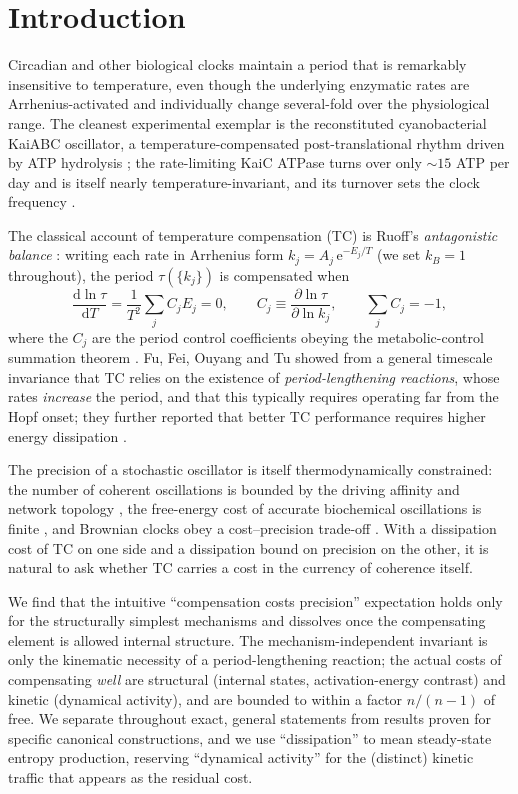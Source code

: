 \documentclass[11pt,onecolumn]{article}
\theoremstyle{definition}
\newcommand{\dd}{\mathrm{d}}
\newcommand{\ee}{\mathrm{e}}
\begin{document}
\section{Introduction}

Circadian and other biological clocks maintain a period that is remarkably insensitive to temperature, even though the underlying enzymatic rates are Arrhenius-activated and individually change several-fold over the physiological range. The cleanest experimental exemplar is the reconstituted cyanobacterial KaiABC oscillator, a temperature-compensated post-translational rhythm driven by ATP hydrolysis \cite{Nakajima2005}; the rate-limiting KaiC ATPase turns over only $\sim 15$ ATP per day and is itself nearly temperature-invariant, and its turnover sets the clock frequency \cite{Terauchi2007}.

The classical account of temperature compensation (TC) is Ruoff's \emph{antagonistic balance} \cite{Ruoff1992}: writing each rate in Arrhenius form $k_j = A_j\,\ee^{-E_j/T}$ (we set $k_B=1$ throughout), the period $\tau(\{k_j\})$ is compensated when
\begin{equation}
\frac{\dd \ln\tau}{\dd T} = \frac{1}{T^2}\sum_j C_j E_j = 0,
\qquad
C_j \equiv \frac{\partial\ln\tau}{\partial\ln k_j},
\qquad
\sum_j C_j = -1,
\label{eq:ruoff}
\end{equation}
where the $C_j$ are the period control coefficients obeying the metabolic-control summation theorem \cite{Wu2017,RuoffWesterhoff2007}. Fu, Fei, Ouyang and Tu showed from a general timescale invariance that TC relies on the existence of \emph{period-lengthening reactions}, whose rates \emph{increase} the period, and that this typically requires operating far from the Hopf onset; they further reported that better TC performance requires higher energy dissipation \cite{Fu2024}.

The precision of a stochastic oscillator is itself thermodynamically constrained: the number of coherent oscillations is bounded by the driving affinity and network topology \cite{BaratoSeifert2017,Oberreiter2022}, the free-energy cost of accurate biochemical oscillations is finite \cite{Cao2015,Fei2018}, and Brownian clocks obey a cost--precision trade-off \cite{BaratoSeifert2016}. With a dissipation cost of TC on one side and a dissipation bound on precision on the other, it is natural to ask whether TC carries a cost in the currency of coherence itself.

We find that the intuitive ``compensation costs precision'' expectation holds only for the structurally simplest mechanisms and dissolves once the compensating element is allowed internal structure. The mechanism-independent invariant is only the kinematic necessity of a period-lengthening reaction; the actual costs of compensating \emph{well} are structural (internal states, activation-energy contrast) and kinetic (dynamical activity), and are bounded to within a factor $n/(n-1)$ of free. We separate throughout exact, general statements from results proven for specific canonical constructions, and we use ``dissipation'' to mean steady-state entropy production, reserving ``dynamical activity'' for the (distinct) kinetic traffic that appears as the residual cost.
\end{document}
